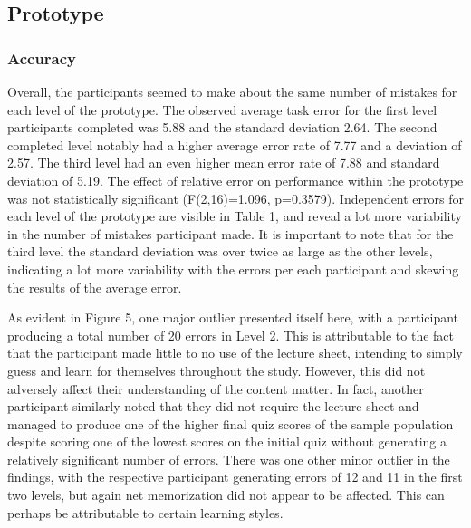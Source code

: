 \documentclass{vgtc}                          %
\begin{document}
\subsection{Prototype}

\subsubsection{Accuracy}

Overall, the participants seemed to make about the same number of mistakes for each level of the prototype. The observed average task error for the first level participants completed was 5.88 and the standard deviation 2.64. The second completed level notably had a higher average error rate of 7.77 and a deviation of 2.57. The third level had an even higher mean error rate of 7.88 and standard deviation of 5.19. The effect of relative error on performance within the prototype was not statistically significant (F(2,16)=1.096, p=0.3579). Independent errors for each level of the prototype are visible in Table 1, and reveal a lot more variability in the number of mistakes participant made. It is important to note that for the third level the standard deviation was over twice as large as the other levels, indicating a lot more variability with the errors per each participant and skewing the results of the average error.

As evident in Figure 5, one major outlier presented itself here, with a participant producing a total number of 20 errors in Level 2. This is attributable to the fact that the participant made little to no use of the lecture sheet, intending to simply guess and learn for themselves throughout the study. However, this did not adversely affect their understanding of the content matter. In fact, another participant similarly noted that they did not require the lecture sheet and managed to produce one of the higher final quiz scores of the sample population despite scoring one of the lowest scores on the initial quiz without generating a relatively significant number of errors. There was one other minor outlier in the findings, with the respective participant generating errors of 12 and 11 in the first two levels, but again net memorization did not appear to be affected. This can perhaps be attributable to certain learning styles.
\end{document}
